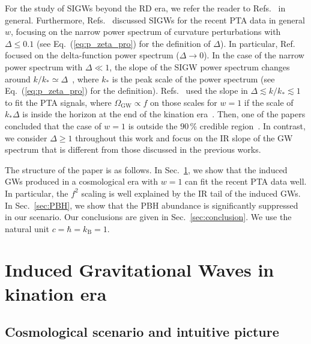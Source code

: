 \documentclass[superscriptaddress, aps, preprintnumbers,
amsmath, amssymb, sort&compress, nofootinbib, 10pt, paper, floatfix]{revtex4-2}
\begin{document}
For the study of SIGWs beyond the RD era, we refer the reader to Refs.~\cite{Domenech:2019quo, Domenech:2020kqm,Witkowski:2021raz} in general. 
Furthermore, Refs.~\cite{Zhao:2023joc, Liu:2023pau} discussed SIGWs for the recent PTA data in general $w$, focusing on the narrow power spectrum of curvature perturbations with $\Delta \leq 0.1$ (see Eq.~(\ref{eq:p_zeta_pro}) for the definition of $\Delta$). 
In particular, Ref.~\cite{Zhao:2023joc} focused on the delta-function power spectrum ($\Delta \rightarrow 0$).
In the case of the narrow power spectrum with $\Delta \ll 1$, the slope of the SIGW power spectrum changes around $k/k_* \simeq \Delta$~\cite{Domenech:2020kqm}, where $k_*$ is the peak scale of the power spectrum (see Eq.~(\ref{eq:p_zeta_pro}) for the definition).
Refs.~\cite{Zhao:2023joc, Liu:2023pau} used the slope in $\Delta \lesssim k/k_* \lesssim 1$ to fit the PTA signals, where $\Omega_{\text{GW}} \propto f$ on those scales for $w=1$ if the scale of $k_* \Delta$ is inside the horizon at the end of the kination era~\cite{Domenech:2020kqm}.
Then, one of the papers concluded that the case of $w=1$ is outside the $90\,\%$ credible region~\cite{Liu:2023pau}.
In contrast, we consider $\Delta \geq 1$ throughout this work and focus on the IR slope of the GW spectrum that is different from those discussed in the previous works.




The structure of the paper is as follows. In Sec.~\ref{sec:GW}, we show that the induced GWs produced in a cosmological era with $w=1$ can fit the recent PTA data well.  In particular, the $f^2$ scaling is well explained by the IR tail of the induced GWs. In Sec.~\ref{sec:PBH}, we show that the PBH abundance is significantly suppressed in our scenario.  Our conclusions are given in Sec.~\ref{sec:conclusion}. 
We use the natural unit $c = \hbar = k_\text{B} = 1$.


\section{Induced Gravitational Waves in kination era} \label{sec:GW}

\subsection{Cosmological scenario and intuitive picture}
\label{subsec:intuitive_pic}
\end{document}
